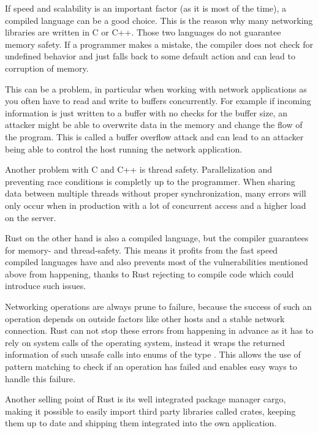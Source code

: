 If speed and scalability is an important factor (as it is most of the time), a compiled language can be a good choice.
This is the reason why many networking libraries are written in C or C++. Those two languages do not guarantee memory
safety. If a programmer makes a mistake, the compiler does not check for undefined behavior and just falls back to some
default action and can lead to corruption of memory.

This can be a problem, in particular when working with network applications as you often have to read and write to
buffers concurrently. For example if incoming information is just written to a buffer with no checks for the buffer
size, an attacker might be able to overwrite data in the memory and change the flow of the program. This is called a
buffer overflow attack and can lead to an attacker being able to control the host running the network application.
\cite{c00buffer}

Another problem with C and C++ is thread safety. Parallelization and preventing race conditions is completly up to the
programmer. When sharing data between multiple threads without proper synchronization, many errors will only occur when
in production with a lot of concurrent access and a higher load on the server.

Rust on the other hand is also a compiled language, but the compiler guarantees for memory- and thread-safety. This
means it profits from the fast speed compiled languages have and also prevents most of the vulnerabilities mentioned
above from happening, thanks to Rust rejecting to compile code which could introduce such issues.

Networking operations are always prune to failure, because the success of such an operation depends on outside factors
like other hosts and a stable network connection. Rust can not stop these errors from happening in advance as it has to
rely on system calls of the operating system, instead it wraps the returned information of such unsafe calls into
enums of the type . This allows the use of pattern matching to check if an operation has
failed and enables easy ways to handle this failure.

Another selling point of Rust is its well integrated package manager cargo, making it possible to easily import third
party libraries called crates, keeping them up to date and shipping them integrated into the own application.

